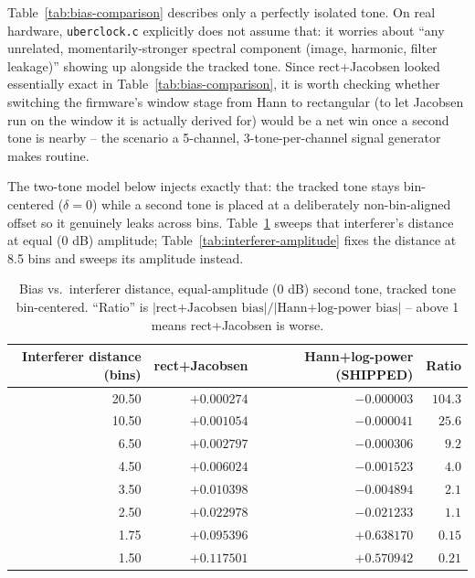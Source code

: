 \documentclass[11pt]{article}
\begin{document}
Table~\ref{tab:bias-comparison} describes only a perfectly isolated
tone. On real hardware, \texttt{uberclock.c} explicitly does not
assume that: it worries about ``any unrelated, momentarily-stronger
spectral component (image, harmonic, filter leakage)'' showing up
alongside the tracked tone. Since rect+Jacobsen looked essentially
exact in Table~\ref{tab:bias-comparison}, it is worth checking whether
switching the firmware's window stage from Hann to rectangular (to let
Jacobsen run on the window it is actually derived for) would be a net
win once a second tone is nearby -- the scenario a 5-channel,
3-tone-per-channel signal generator makes routine.

The two-tone model below injects exactly that: the tracked tone stays
bin-centered ($\delta = 0$) while a second tone is placed at a
deliberately non-bin-aligned offset so it genuinely leaks across bins.
Table~\ref{tab:interferer-distance} sweeps that interferer's distance
at equal (0 dB) amplitude; Table~\ref{tab:interferer-amplitude} fixes
the distance at 8.5 bins and sweeps its amplitude instead.

\begin{table}[H]
  \centering
  \caption{Bias vs.\ interferer distance, equal-amplitude (0 dB)
  second tone, tracked tone bin-centered. ``Ratio'' is
  $|\text{rect+Jacobsen bias}| / |\text{Hann+log-power bias}|$ --
  above 1 means rect+Jacobsen is worse.}
  \label{tab:interferer-distance}
  \begin{tabular}{rrrr}
    \toprule
    Interferer distance (bins) & rect+Jacobsen & Hann+log-power (SHIPPED) & Ratio \\
    \midrule
    20.50 & $+0.000274$ & $-0.000003$ & $104.3$ \\
    10.50 & $+0.001054$ & $-0.000041$ & $25.6$ \\
    6.50  & $+0.002797$ & $-0.000306$ & $9.2$ \\
    4.50  & $+0.006024$ & $-0.001523$ & $4.0$ \\
    3.50  & $+0.010398$ & $-0.004894$ & $2.1$ \\
    2.50  & $+0.022978$ & $-0.021233$ & $1.1$ \\
    1.75  & $+0.095396$ & $+0.638170$ & $0.15$ \\
    1.50  & $+0.117501$ & $+0.570942$ & $0.21$ \\
    \bottomrule
  \end{tabular}
\end{table}
\end{document}

